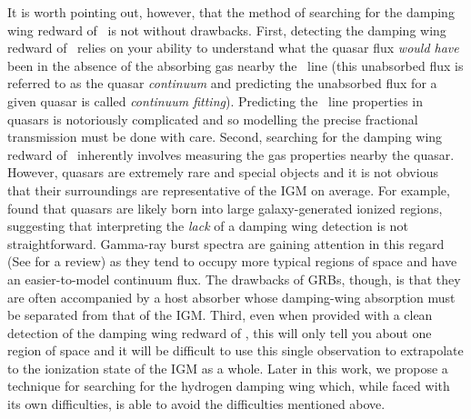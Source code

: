 It is worth pointing out, however, that the method of searching for the damping wing redward of \lya\ is not without drawbacks. First, detecting the damping wing redward of \lya\ relies on your ability to understand what the quasar flux \textit{would have} been in the absence of the absorbing gas nearby the \lya\ line (this unabsorbed flux is referred to as the quasar \textit{continuum} and predicting the unabsorbed flux for a given quasar is called \textit{continuum fitting}). Predicting the \lya\ line properties in quasars is notoriously complicated and so modelling the precise fractional transmission must be done with care. Second, searching for the damping wing redward of \lya\ inherently involves measuring the gas properties nearby the quasar. However, quasars are extremely rare and special objects and it is not obvious that their surroundings are representative of the IGM on average. For example, \cite{Lidz:2007mz} found that quasars are likely born into large galaxy-generated ionized regions, suggesting that interpreting the \textit{lack} of a damping wing detection is not straightforward. Gamma-ray burst spectra are gaining attention in this regard (See \citealt{Salvaterra:2015gpa} for a review) as they tend to occupy more typical regions of space and have an easier-to-model continuum flux. The drawbacks of GRBs, though, is that they are often accompanied by a host absorber whose damping-wing absorption must be separated from that of the IGM. Third, even when provided with a clean detection of the damping wing redward of \lya, this will only tell you about one region of space and it will be difficult to use this single observation to extrapolate to the ionization state of the IGM as a whole. Later in this work, we propose a technique for searching for the hydrogen damping wing which, while faced with its own difficulties, is able to avoid the difficulties mentioned above. 




